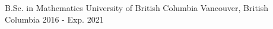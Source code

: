 

\begin{cventries}

  \cventry
    {B.Sc. in Mathematics} %
    {University of British Columbia} %
    {Vancouver, British Columbia} %
    {2016 - Exp. 2021} %
    {}

\end{cventries}
